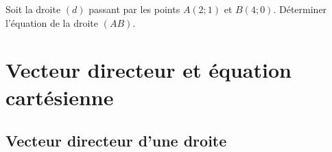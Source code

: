 \documentclass[11pt]{article}
\begin{document}
\begin{app}
  Soit la droite $(d)$ passant par les points $A\left( 2; 1 \right)$ et $B\left(
  4;0 \right)$. Déterminer l'équation de la droite $\left( AB \right)$.
\end{app}

\section{Vecteur directeur et équation cartésienne}
\subsection{Vecteur directeur d'une droite}
\end{document}
